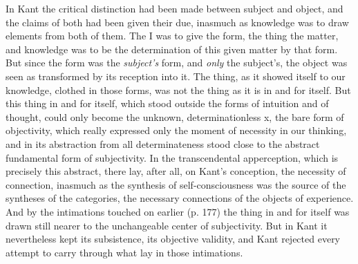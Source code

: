 In Kant the critical distinction had been made between subject and
object, and the claims of both had been given their due, inasmuch as
knowledge was to draw elements from both of them. The I was to give
the form, the thing the matter, and knowledge was to be the
determination of this given matter by that form. But since the form was
the \emph{subject's} form, and \emph{only} the subject's, the object was
seen as transformed by its reception into it. The thing, as it showed
itself to our knowledge, clothed in those forms, was not the thing as
it is in and for itself. But this thing in and for itself,
which stood outside the forms of intuition and of thought, could only
become the unknown, determinationless x, the bare form of objectivity,
which really expressed only the moment of necessity in our thinking,
and in its abstraction from all determinateness stood close to the
abstract fundamental form of subjectivity. In the transcendental
apperception, which is precisely this abstract, there lay, after all,
on Kant's conception, the necessity of connection, inasmuch as the
synthesis of self-consciousness was the source of the syntheses of the
categories, the necessary connections of the objects of experience.
And by the intimations touched on earlier (p. 177) the thing in and for
itself was drawn still nearer to the unchangeable center of
subjectivity. But in Kant it nevertheless kept its subsistence, its
objective validity, and Kant rejected every attempt to carry through
what lay in those intimations.

